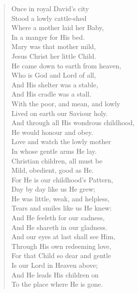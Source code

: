 
\begin{verse}
Once in royal David's city\\
\hspace*{2em}Stood a lowly cattle-shed\\
Where a mother laid her Baby,\\
\hspace*{2em}In a manger for His bed.\\
Mary was that mother mild,\\
Jesus Christ her little Child.\\[0.7em]

He came down to earth from heaven,\\
\hspace*{2em}Who is God and Lord of all,\\
And His shelter was a stable,\\
\hspace*{2em}And His cradle was a stall.\\
With the poor, and mean, and lowly\\
Lived on earth our Saviour holy.\\[0.7em]

And through all His wondrous childhood,\\
\hspace*{2em}He would honour and obey.\\
Love and watch the lowly mother\\
\hspace*{2em}In whose gentle arms He lay.\\
Christian children, all must be\\
Mild, obedient, good as He.\\[0.7em]

For He is our childhood's Pattern,\\
\hspace*{2em}Day by day like us He grew;\\
He was little, weak, and helpless,\\
\hspace*{2em}Tears and smiles like us He knew:\\
And He feeleth for our sadness,\\
And He shareth in our gladness.\\[0.7em]

And our eyes at last shall see Him,\\
\hspace*{2em}Through His own redeeming love,\\
For that Child so dear and gentle\\
\hspace*{2em}Is our Lord in Heaven above;\\
And He leads His children on\\
To the place where He is gone.\\[0.7em]


\end{verse}
